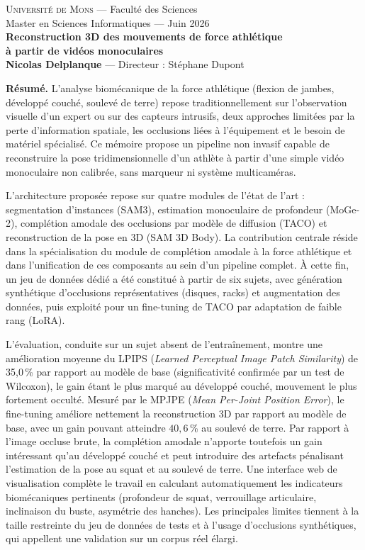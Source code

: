 \documentclass[11pt,a4paper]{article}
\begin{document}
\thispagestyle{empty}

\begin{center}
  {\large\textsc{Université de Mons} --- Faculté des Sciences}\\[0.3em]
  {\normalsize Master en Sciences Informatiques --- Juin 2026}\\[1.2em]
  {\Large\bfseries Reconstruction 3D des mouvements de force athlétique\\
  à partir de vidéos monoculaires}\\[0.8em]
  {\normalsize \textbf{Nicolas Delplanque} \quad --- \quad Directeur : Stéphane Dupont}
\end{center}

\vspace{1em}

\noindent\textbf{Résumé.}
L'analyse biomécanique de la force athlétique (flexion de jambes, développé couché, soulevé de
terre) repose traditionnellement sur l'observation visuelle d'un expert ou sur des
capteurs intrusifs, deux approches limitées par la perte d'information spatiale, les
occlusions liées à l'équipement et le besoin de matériel spécialisé. Ce mémoire propose
un pipeline non invasif capable de reconstruire la pose tridimensionnelle d'un athlète à
partir d'une simple vidéo monoculaire non calibrée, sans marqueur ni système
multicaméras.

L'architecture proposée repose sur quatre modules de l'état de l'art : segmentation
d'instances (SAM3), estimation monoculaire de profondeur (MoGe-2), complétion amodale
des occlusions par modèle de diffusion (TACO) et reconstruction de la pose en 3D (SAM 3D Body).
La contribution centrale réside dans la spécialisation du module de complétion amodale à
la force athlétique et dans l'unification de ces composants au sein d'un pipeline complet.
À cette fin, un jeu de données dédié a été constitué à partir de six sujets, avec génération
synthétique d'occlusions représentatives (disques, racks) et augmentation des données,
puis exploité pour un fine-tuning de TACO par adaptation de faible rang (LoRA).

L'évaluation, conduite sur un sujet absent de l'entraînement, montre une amélioration
moyenne du LPIPS (\textit{Learned Perceptual Image Patch Similarity}) de 35,0\,\% par rapport 
au modèle de base (significativité confirmée par un test de Wilcoxon), le gain étant le plus marqué 
au développé couché, mouvement le plus fortement occulté. Mesuré par le MPJPE 
(\textit{Mean Per-Joint Position Error}), le fine-tuning améliore nettement la reconstruction 3D par 
rapport au modèle de base, avec un gain pouvant atteindre $40,6$\,\% au soulevé de terre. Par rapport à l'image occluse brute, 
la complétion amodale n'apporte toutefois un gain intéressant qu'au développé
couché et peut introduire des artefacts pénalisant l'estimation de la pose au squat et au soulevé de terre.
Une interface web de visualisation complète le travail en calculant automatiquement les indicateurs
biomécaniques pertinents (profondeur de squat, verrouillage articulaire, inclinaison du
buste, asymétrie des hanches). Les principales limites tiennent à la taille restreinte du
jeu de données de tests et à l'usage d'occlusions synthétiques, qui appellent une validation sur un
corpus réel élargi.
\end{document}
